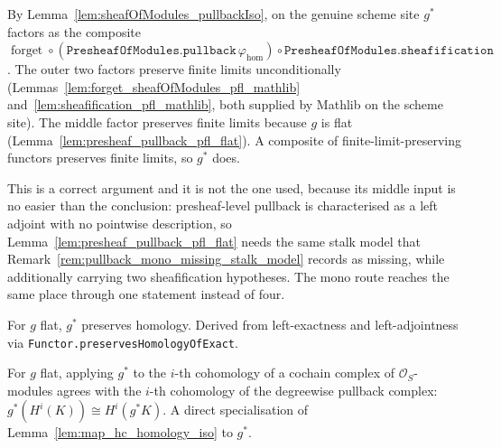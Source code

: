 \begin{remark}
  \label{rem:pullback_pfl_three_factor_route}
  By Lemma~\ref{lem:sheafOfModules_pullbackIso}, on the genuine scheme site \(g^*\)
  factors as the composite
  \(\operatorname{forget} \circ
  (\texttt{PresheafOfModules.pullback}\,\varphi_{\mathrm{hom}}) \circ
  \texttt{PresheafOfModules.sheafification}\). The outer two factors preserve finite
  limits unconditionally (Lemmas~\ref{lem:forget_sheafOfModules_pfl_mathlib}
  and~\ref{lem:sheafification_pfl_mathlib}, both supplied by Mathlib on the scheme
  site). The middle factor preserves finite limits because \(g\) is flat
  (Lemma~\ref{lem:presheaf_pullback_pfl_flat}). A composite of
  finite-limit-preserving functors preserves finite limits, so \(g^*\) does.

  This is a correct argument and it is not the one used, because its middle input is no easier
  than the conclusion: presheaf-level pullback is characterised as a left adjoint with no
  pointwise description, so Lemma~\ref{lem:presheaf_pullback_pfl_flat} needs the same stalk
  model that Remark~\ref{rem:pullback_mono_missing_stalk_model} records as missing, while
  additionally carrying two sheafification hypotheses. The mono route reaches the same place
  through one statement instead of four.
\end{remark}

\begin{lemma}
  \label{lem:pullback_preserves_homology}
  For \(g\) flat, \(g^*\) preserves homology. Derived from left-exactness and
  left-adjointness via \texttt{Functor.preservesHomologyOfExact}.
\end{lemma}

\begin{lemma}\leanok
  \label{lem:pullback_mapHC_homologyIso}
  For \(g\) flat, applying \(g^*\) to the \(i\)-th cohomology of a cochain complex of
  \(\mathcal{O}_S\)-modules agrees with the \(i\)-th cohomology of the degreewise
  pullback complex: \(g^*(H^i(K)) \cong H^i(g^* K)\). A direct specialisation of
  Lemma~\ref{lem:map_hc_homology_iso} to \(g^*\).
\end{lemma}

